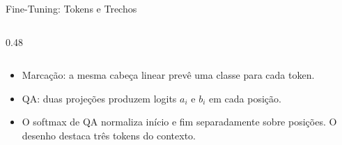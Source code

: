 \documentclass[aspectratio=169, xcolor=dvipsnames]{beamer}
\begin{document}
\begin{frame}{Fine-Tuning: Tokens e Trechos}
\begin{columns}[T]
\begin{column}{0.48\textwidth}
{}
      \end{column}
    \end{columns}
    \medskip
    \begin{itemize}
      \item Marcação: a mesma cabeça linear prevê uma classe para cada token.
      \item QA: duas projeções produzem logits $a_i$ e $b_i$ em cada posição.
      \item O softmax de QA normaliza início e fim separadamente sobre posições. O desenho destaca três tokens do contexto.
    \end{itemize}
  \end{frame}
\end{document}
